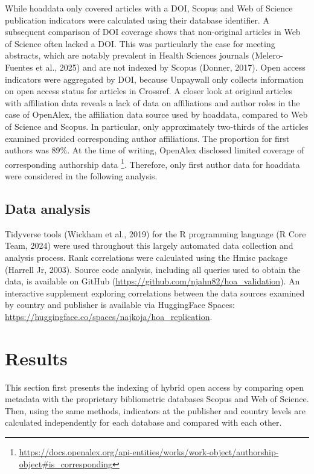 \documentclass[a4paper,man,floatsintext,longtable,noextraspace,10pt]{apa6}
\begin{document}
While hoaddata only covered articles with a DOI, Scopus and Web of
Science publication indicators were calculated using their database
identifier. A subsequent comparison of DOI coverage shows that
non-original articles in Web of Science often lacked a DOI. This was
particularly the case for meeting abstracts, which are notably prevalent
in Health Sciences journals (Melero-Fuentes et al., 2025) and are not
indexed by Scopus (Donner, 2017). Open access indicators were aggregated
by DOI, because Unpaywall only collects information on open access
status for articles in Crossref. A closer look at original articles with
affiliation data reveals a lack of data on affiliations and author roles
in the case of OpenAlex, the affiliation data source used by hoaddata,
compared to Web of Science and Scopus. In particular, only approximately
two-thirds of the articles examined provided corresponding author
affiliations. The proportion for first authors was 89\%. At the time of
writing, OpenAlex disclosed limited coverage of corresponding authorship
data \footnote{\url{https://docs.openalex.org/api-entities/works/work-object/authorship-object\#is_corresponding}}.
Therefore, only first author data for hoaddata were considered in the
following analysis.

\subsection{Data analysis}\label{data-analysis}

Tidyverse tools (Wickham et al., 2019) for the R programming language (R
Core Team, 2024) were used throughout this largely automated data
collection and analysis process. Rank correlations were calculated using
the Hmisc package (Harrell Jr, 2003). Source code analysis, including
all queries used to obtain the data, is available on GitHub
(\url{https://github.com/njahn82/hoa_validation}). An interactive
supplement exploring correlations between the data sources examined by
country and publisher is available via HuggingFace Spaces:
\url{https://huggingface.co/spaces/najkoja/hoa_replication}.

\section{Results}\label{results}

This section first presents the indexing of hybrid open access by
comparing open metadata with the proprietary bibliometric databases
Scopus and Web of Science. Then, using the same methods, indicators at
the publisher and country levels are calculated independently for each
database and compared with each other.
\end{document}
